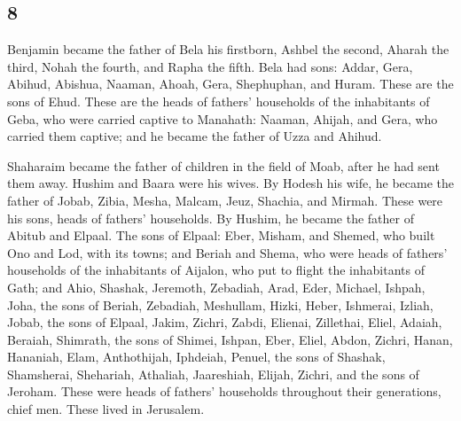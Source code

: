 \begin{paracol}{2}
\switchcolumn
\begin{otherlanguage}{english}

\hypertarget{section-15}{%
\section{8}\label{section-15}}

 Benjamin became the father of Bela his firstborn, Ashbel
the second, Aharah the third,  Nohah the fourth, and Rapha
the fifth.  Bela had sons: Addar, Gera, Abihud,
 Abishua, Naaman, Ahoah,  Gera, Shephuphan,
and Huram.  These are the sons of Ehud. These are the
heads of fathers' households of the inhabitants of Geba, who were
carried captive to Manahath:  Naaman, Ahijah, and Gera,
who carried them captive; and he became the father of Uzza and Ahihud.

 Shaharaim became the father of children in the field of
Moab, after he had sent them away. Hushim and Baara were his wives.
 By Hodesh his wife, he became the father of Jobab, Zibia,
Mesha, Malcam,  Jeuz, Shachia, and Mirmah. These were his
sons, heads of fathers' households.  By Hushim, he became
the father of Abitub and Elpaal.  The sons of Elpaal:
Eber, Misham, and Shemed, who built Ono and Lod, with its towns;
 and Beriah and Shema, who were heads of fathers'
households of the inhabitants of Aijalon, who put to flight the
inhabitants of Gath;  and Ahio, Shashak, Jeremoth,
 Zebadiah, Arad, Eder,  Michael, Ishpah,
Joha, the sons of Beriah,  Zebadiah, Meshullam, Hizki,
Heber,  Ishmerai, Izliah, Jobab, the sons of Elpaal,
 Jakim, Zichri, Zabdi,  Elienai,
Zillethai, Eliel,  Adaiah, Beraiah, Shimrath, the sons of
Shimei,  Ishpan, Eber, Eliel,  Abdon,
Zichri, Hanan,  Hananiah, Elam, Anthothijah,
 Iphdeiah, Penuel, the sons of Shashak, 
Shamsherai, Shehariah, Athaliah,  Jaareshiah, Elijah,
Zichri, and the sons of Jeroham.  These were heads of
fathers' households throughout their generations, chief men. These lived
in Jerusalem.


\end{otherlanguage}
\end{paracol}
